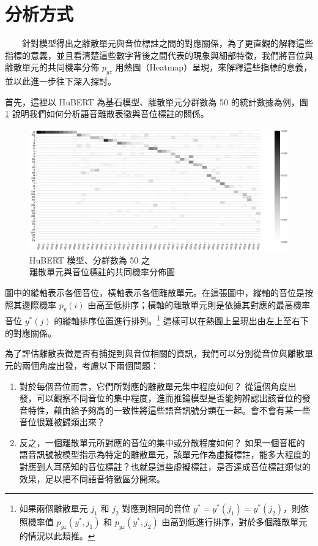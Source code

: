 

{

\section{分析方式}

　　針對模型得出之離散單元與音位標註之間的對應關係，為了更直觀的解釋這些指標的意義，並且看清楚這些數字背後之間代表的現象與細部特徵，我們將音位與離散單元的共同機率分佈 \(p_{yz}\) 用熱圖（Heatmap）呈現，來解釋這些指標的意義，並以此進一步往下深入探討。

        首先，這裡以 HuBERT 為基石模型、離散單元分群數為 50 的統計數據為例，圖 \ref{fig:hubert-50-joint-byprob} 說明我們如何分析語音離散表徵與音位標註的關係。

\begin{figure}
    \centering
    \includegraphics[width=1\linewidth]{figures/hubert-50-joint-byprob.png}
    \caption{HuBERT 模型、分群數為 50 之 \\
    離散單元與音位標註的共同機率分佈圖}
    \label{fig:hubert-50-joint-byprob}
\end{figure}

        圖中的縱軸表示各個音位，橫軸表示各個離散單元。在這張圖中，縱軸的音位是按照其邊際機率 \(p_y(i)\) 由高至低排序；橫軸的離散單元則是依據其對應的最高機率音位 \(y^\ast(j)\) 的縱軸排序位置進行排列。\footnote{如果兩個離散單元 \(j_1\) 和 \(j_2\) 對應到相同的音位 \(y^\ast = y^\ast(j_1) = y^\ast(j_2)\)，則依照機率值 \(p_{yz}(y^\ast, j_1)\) 和 \(p_{yz}(y^\ast, j_2)\) 由高到低進行排序，對於多個離散單元的情況以此類推。} 這樣可以在熱圖上呈現出由左上至右下的對應關係。

        為了評估離散表徵是否有捕捉到與音位相關的資訊，我們可以分別從音位與離散單元的兩個角度出發，考慮以下兩個問題：
\begin{enumerate}
    \item 對於每個音位而言，它們所對應的離散單元集中程度如何？
從這個角度出發，可以觀察不同音位的集中程度，進而推論模型是否能夠辨認出該音位的發音特性，藉由給予夠高的一致性將這些語音訊號分類在一起。會不會有某一些音位很難被歸類出來？
    \item 反之，一個離散單元所對應的音位的集中或分散程度如何？
如果一個音框的語音訊號被模型指示為特定的離散單元，該單元作為虛擬標註，能多大程度的對應到人耳感知的音位標註？也就是這些虛擬標註，是否達成音位標註類似的效果，足以把不同語音特徵區分開來。
\end{enumerate}

}
